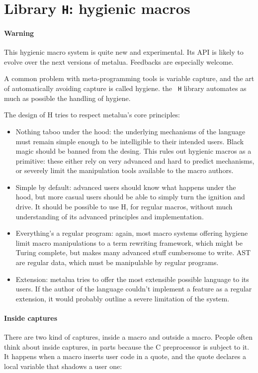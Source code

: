 \section{Library {\tt H}: hygienic macros}

\paragraph{Warning} This hygienic macro system is quite new and
experimental. Its API is likely to evolve over the next versions of
metalua. Feedbacks are especially welcome.

A common problem with meta-programming tools is variable capture, and
the art of automatically avoiding capture is called hygiene. the {\tt
  H} library automates as much as possible the handling of hygiene.

The design of H tries to respect metalua's core principles:
\begin{itemize}
\item Nothing taboo under the hood: the underlying mechanisms of the
  language must remain simple enough to be intelligible to their
  intended users. Black magic should be banned from the desing. This
  rules out hygienic macros as a primitive: these either rely on very
  advanced and hard to predict mechanisms, or severely limit the
  manipulation tools available to the macro authors.
\item Simple by default: advanced users should know what happens under
  the hood, but more casual users should be able to simply turn the
  ignition and drive. It should be possible to use H, for regular
  macros, without much understanding of its advanced principles and
  implementation.
\item Everything's a regular program: again, most macro systems
  offering hygiene limit macro manipulations to a term rewriting
  framework, which might be Turing complete, but makes many advanced
  stuff cumbersome to write. AST are regular data, which must be
  manipulable by regular programs.
\item Extension: metalua tries to offer the most extensible possible
  language to its users. If the author of the language couldn't
  implement a feature as a regular extension, it would probably
  outline a severe limitation of the system.
\end{itemize}

\paragraph{Inside captures}
There are two kind of captures, inside a macro and outside a
macro. People often think about inside captures, in parts because the
C preprocessor is subject to it. It happens when a macro inserts user
code in a quote, and the quote declares a local variable that shadows
a user one:

